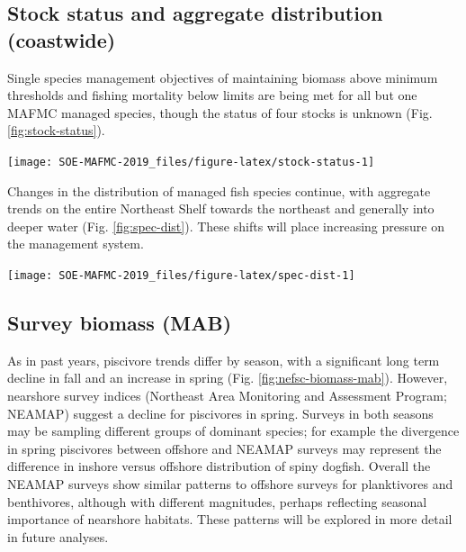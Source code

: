 \documentclass[10pt,]{article}
\let\origfigure\figure
\let\endorigfigure\endfigure
\renewenvironment{figure}[1][2] {
    \expandafter\origfigure\expandafter[H]
} {
    \endorigfigure
}
\begin{document}
\subsection{Stock status and aggregate distribution
(coastwide)}\label{stock-status-and-aggregate-distribution-coastwide}

Single species management objectives of maintaining biomass above
minimum thresholds and fishing mortality below limits are being met for
all but one MAFMC managed species, though the status of four stocks is
unknown (Fig. \ref{fig:stock-status}).

\begin{figure}

{\centering \texttt{[image: SOE-MAFMC-2019\_files/figure-latex/stock-status-1]} 

}

\caption{Summary of single species status for MAFMC and jointly managed stocks.}\label{fig:stock-status}
\end{figure}

Changes in the distribution of managed fish species continue, with
aggregate trends on the entire Northeast Shelf towards the northeast and
generally into deeper water (Fig. \ref{fig:spec-dist}). These shifts
will place increasing pressure on the management system.

\begin{figure}

{\centering \texttt{[image: SOE-MAFMC-2019\_files/figure-latex/spec-dist-1]} 

}

\caption{Aggregate species distribution metrics for species in the Northeast Large Marine Ecosystem.}\label{fig:spec-dist}
\end{figure}

\subsection{Survey biomass (MAB)}\label{survey-biomass-mab}

As in past years, piscivore trends differ by season, with a significant
long term decline in fall and an increase in spring (Fig.
\ref{fig:nefsc-biomass-mab}). However, nearshore survey indices
(Northeast Area Monitoring and Assessment Program; NEAMAP) suggest a
decline for piscivores in spring. Surveys in both seasons may be
sampling different groups of dominant species; for example the
divergence in spring piscivores between offshore and NEAMAP surveys may
represent the difference in inshore versus offshore distribution of
spiny dogfish. Overall the NEAMAP surveys show similar patterns to
offshore surveys for planktivores and benthivores, although with
different magnitudes, perhaps reflecting seasonal importance of
nearshore habitats. These patterns will be explored in more detail in
future analyses.
\end{document}
